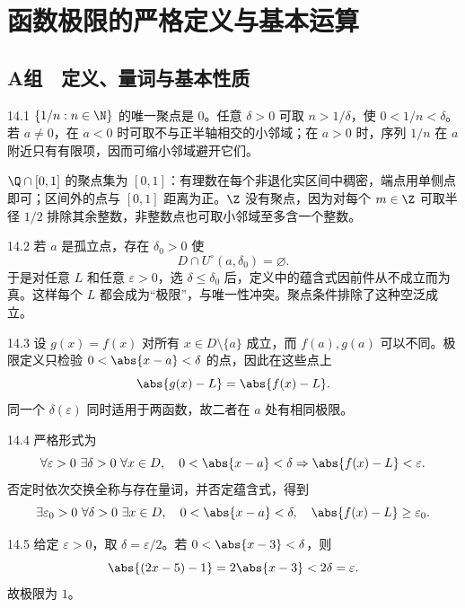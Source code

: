 \chapter{函数极限的严格定义与基本运算}

\section*{A组　定义、量词与基本性质}

\begin{solution}{14.1}
\(\{1/n:n\in\N\}\) 的唯一聚点是 \(0\)。任意 \(\delta>0\) 可取 \(n>1/\delta\)，使 \(0<1/n<\delta\)。若 \(a\ne0\)，在 \(a<0\) 时可取不与正半轴相交的小邻域；在 \(a>0\) 时，序列 \(1/n\) 在 \(a\) 附近只有有限项，因而可缩小邻域避开它们。

\(\Q\cap[0,1]\) 的聚点集为 \([0,1]\)：有理数在每个非退化实区间中稠密，端点用单侧点即可；区间外的点与 \([0,1]\) 距离为正。\(\Z\) 没有聚点，因为对每个 \(m\in\Z\) 可取半径 \(1/2\) 排除其余整数，非整数点也可取小邻域至多含一个整数。
\end{solution}

\begin{solution}{14.2}
若 \(a\) 是孤立点，存在 \(\delta_0>0\) 使
\[
 D\cap U^\circ(a,\delta_0)=\varnothing.
\]
于是对任意 \(L\) 和任意 \(\varepsilon>0\)，选 \(\delta\le\delta_0\) 后，定义中的蕴含式因前件从不成立而为真。这样每个 \(L\) 都会成为“极限”，与唯一性冲突。聚点条件排除了这种空泛成立。
\end{solution}

\begin{solution}{14.3}
设 \(g(x)=f(x)\) 对所有 \(x\in D\setminus\{a\}\) 成立，而 \(f(a),g(a)\) 可以不同。极限定义只检验 \(0<\abs{x-a}<\delta\) 的点，因此在这些点上
\[
 \abs{g(x)-L}=\abs{f(x)-L}.
\]
同一个 \(\delta(\varepsilon)\) 同时适用于两函数，故二者在 \(a\) 处有相同极限。
\end{solution}

\begin{solution}{14.4}
严格形式为
\[
 \forall\varepsilon>0\ \exists\delta>0\ \forall x\in D,\quad
 0<\abs{x-a}<\delta\Rightarrow\abs{f(x)-L}<\varepsilon.
\]
否定时依次交换全称与存在量词，并否定蕴含式，得到
\[
 \exists\varepsilon_0>0\ \forall\delta>0\ \exists x\in D,\quad
 0<\abs{x-a}<\delta,\quad\abs{f(x)-L}\ge\varepsilon_0.
\]
\end{solution}

\begin{solution}{14.5}
给定 \(\varepsilon>0\)，取 \(\delta=\varepsilon/2\)。若 \(0<\abs{x-3}<\delta\)，则
\[
 \abs{(2x-5)-1}=2\abs{x-3}<2\delta=\varepsilon.
\]
故极限为 \(1\)。
\end{solution}

